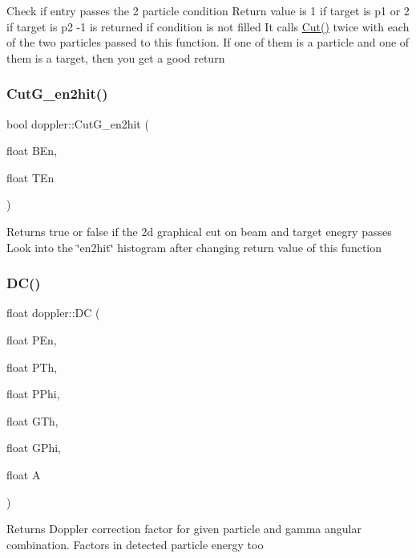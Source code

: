 Check if entry passes the 2 particle condition Return value is 1 if target is p1 or 2 if target is p2 -\/1 is returned if condition is not filled It calls \hyperlink{classdoppler_aa3debb227d73f7cdea5b02e4c202cb19}{Cut()} twice with each of the two particles passed to this function. If one of them is a particle and one of them is a target, then you get a good return \mbox{\label{classdoppler_a56df9f9384f469385458193754c743c9}} 
\subsubsection{\texorpdfstring{Cut\+G\+\_\+en2hit()}{CutG\_en2hit()}}
{\footnotesize\ttfamily bool doppler\+::\+Cut\+G\+\_\+en2hit (\begin{DoxyParamCaption}\item[{float}]{B\+En,  }\item[{float}]{T\+En }\end{DoxyParamCaption})}

Returns true or false if the 2d graphical cut on beam and target enegry passes Look into the \char`\"{}en2hit\char`\"{} histogram after changing return value of this function \mbox{\label{classdoppler_a7f08d93d2bfa269f8c22ac71b604b09a}} 
\subsubsection{\texorpdfstring{D\+C()}{DC()}}
{\footnotesize\ttfamily float doppler\+::\+DC (\begin{DoxyParamCaption}\item[{float}]{P\+En,  }\item[{float}]{P\+Th,  }\item[{float}]{P\+Phi,  }\item[{float}]{G\+Th,  }\item[{float}]{G\+Phi,  }\item[{float}]{A }\end{DoxyParamCaption})}

Returns Doppler correction factor for given particle and gamma angular combination. Factors in detected particle energy too \mbox{\label{classdoppler_ad8387753c2288d464b64579a23d3bc4e}} 
